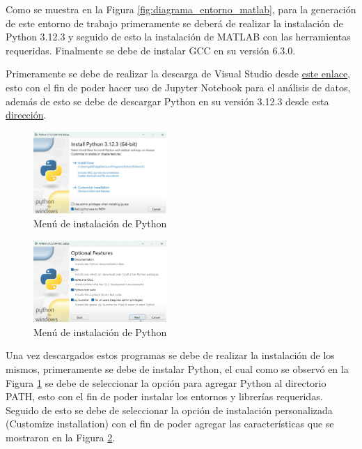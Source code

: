 Como se muestra en la Figura \ref{fig:diagrama_entorno_matlab}, para la generación de este entorno de trabajo primeramente se deberá de realizar la instalación de Python 3.12.3 y seguido de esto la instalación de MATLAB con las herramientas requeridas. Finalmente se debe de instalar GCC en su versión 6.3.0.

Primeramente se debe de realizar la descarga de Visual Studio desde \href{https://code.visualstudio.com/sha/download?build=stable&os=win32-x64-user}{este enlace}, esto con el fin de poder hacer uso de Jupyter Notebook para el análisis de datos, además de esto se debe de descargar Python en su versión 3.12.3 desde esta \href{https://www.python.org/ftp/python/3.12.3/python-3.12.3-amd64.exe}{dirección}. 


\begin{figure}[h!]
    \centering
    \includegraphics[width=0.45\textwidth]{fig/especifico_2/Ambiente_matlab/instalacion_python.png}
    \caption{Menú de instalación de Python}
    \label{fig:menu_python}
\end{figure}


\begin{figure}[h!]
    \centering
    \includegraphics[width=0.45\textwidth]{fig/especifico_2/Ambiente_matlab/opciones_adicionales_python.png}
    \caption{Menú de instalación de Python}
    \label{fig:menu_python_adicionales}
\end{figure}

Una vez descargados estos programas se debe de realizar la instalación de los mismos, primeramente se debe de instalar Python, el cual como se observó en la Figura \ref{fig:menu_python} se debe de seleccionar la opción para agregar Python al directorio PATH, esto con el fin de poder instalar los entornos y librerías requeridas. Seguido de esto se debe de seleccionar la opción de instalación personalizada (Customize installation) con el fin de poder agregar las características que se mostraron en la Figura \ref{fig:menu_python_adicionales}. 


